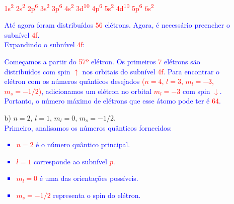 \documentclass[a4paper, 12pt]{article}
\begin{document}
\begin{enumerate}
\begin{enumerate}
\begin{multicols}{2}
			            \vspace{10pt}
			            
			            \text{\textcolor{blue}{Fazemos a distribuição dos elétrons}:}
			            \textcolor{red}{
				            1s\textsuperscript{2} \quad 2s\textsuperscript{2} \quad 2p\textsuperscript{6} \quad 3s\textsuperscript{2} \quad 3p\textsuperscript{6} \quad 4s\textsuperscript{2} \quad 3d\textsuperscript{10} 4p\textsuperscript{6} \quad 5s\textsuperscript{2} \quad 4d\textsuperscript{10} \quad 5p\textsuperscript{6} \quad 6s\textsuperscript{2}
			            }
			            
			            \textcolor{blue}{Até agora foram distribuídos \textcolor{red}{56} elétrons. Agora, é necessário preencher o subnível \textcolor{red}{4f}.}
			            \\[10pt]
			            \textcolor{blue}{Expandindo o subnível \textcolor{red}{4f}:
			            }
			            
			            
			            
			            \textcolor{blue}{Começamos a partir do \textcolor{red}{57º} elétron. Os primeiros \textcolor{red}{7} elétrons são distribuídos com spin \textcolor{red}{\(\uparrow\)} nos orbitais do subnível \textcolor{red}{4f}. Para encontrar o elétron com os números quânticos desejados \textcolor{red}{(\(n = 4\), \(l = 3\), \(m_l = -3\), \(m_s = -1/2\))}, adicionamos um elétron no orbital \textcolor{red}{\(m_l = -3\)} com spin \textcolor{red}{\(\downarrow\)}.}
			            \textcolor{blue}{Portanto, o número máximo de elétrons que esse átomo pode ter é \textcolor{red}{64}.}
		            \end{multicols}
		            
		      \item[b)] \(n = 2\), \(l = 1\), \(m_l = 0\), \(m_s = -1/2\).
		            \\[10pt]
		            \small 
		            \textcolor{blue}{Primeiro, analisamos os números quânticos fornecidos:}
		            \begin{multicols}{2}
			            \textcolor{blue}{
				            \begin{itemize}
					            \item \textcolor{red}{\(n = 2\)} é o número quântico principal.
					            \item \textcolor{red}{\(l = 1\)} corresponde ao subnível \textcolor{red}{\(p\)}.
				            \end{itemize}
			            }
			            \columnbreak
			            \textcolor{blue}{
				            \begin{itemize}
					            \item \textcolor{red}{\(m_l = 0\)} é uma das orientações possíveis.
					            \item \textcolor{red}{\(m_s = -1/2\)} representa o spin do elétron.
				            \end{itemize}
			            }
		            \end{multicols}
		            

\end{enumerate}
\end{enumerate}
\end{document}
